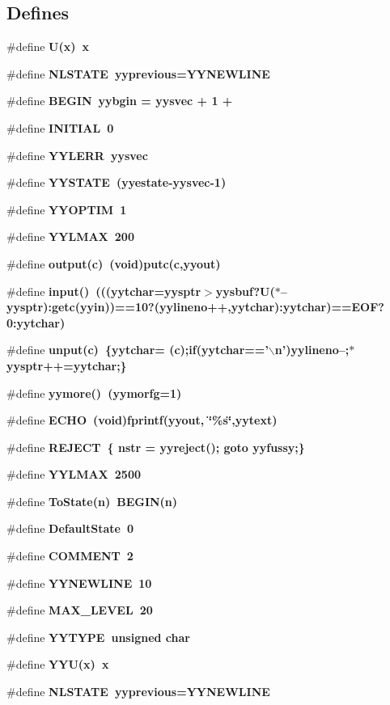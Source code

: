\subsection*{Defines}
\begin{CompactItemize}
\item 
\#define \bf{U}(x)~x
\item 
\#define \bf{NLSTATE}~\bf{yyprevious}=YYNEWLINE
\item 
\#define \bf{BEGIN}~\bf{yybgin} = \bf{yysvec} + 1 +
\item 
\#define \bf{INITIAL}~0
\item 
\#define \bf{YYLERR}~\bf{yysvec}
\item 
\#define \bf{YYSTATE}~(\bf{yyestate}-\bf{yysvec}-1)
\item 
\#define \bf{YYOPTIM}~1
\item 
\#define \bf{YYLMAX}~200
\item 
\#define \bf{output}(c)~(void)putc(c,\bf{yyout})
\item 
\#define \bf{input}()~(((\bf{yytchar}=\bf{yysptr}$>$\bf{yysbuf}?U($\ast$--\bf{yysptr}):getc(\bf{yyin}))==10?(\bf{yylineno}++,\bf{yytchar}):\bf{yytchar})==EOF?0:\bf{yytchar})
\item 
\#define \bf{unput}(c)~\{\bf{yytchar}= (c);if(\bf{yytchar}=='$\backslash$n')\bf{yylineno}--;$\ast$\bf{yysptr}++=\bf{yytchar};\}
\item 
\#define \bf{yymore}()~(\bf{yymorfg}=1)
\item 
\#define \bf{ECHO}~(void)fprintf(\bf{yyout}, \char`\"{}\%s\char`\"{},yytext)
\item 
\#define \bf{REJECT}~\{ nstr = yyreject(); goto yyfussy;\}
\item 
\#define \bf{YYLMAX}~2500
\item 
\#define \bf{To\-State}(n)~BEGIN(n)
\item 
\#define \bf{Default\-State}~0
\item 
\#define \bf{COMMENT}~2
\item 
\#define \bf{YYNEWLINE}~10
\item 
\#define \bf{MAX\_\-LEVEL}~20
\item 
\#define \bf{YYTYPE}~unsigned char
\item 
\#define \bf{YYU}(x)~x
\item 
\#define \bf{NLSTATE}~\bf{yyprevious}=YYNEWLINE
\end{CompactItemize}
